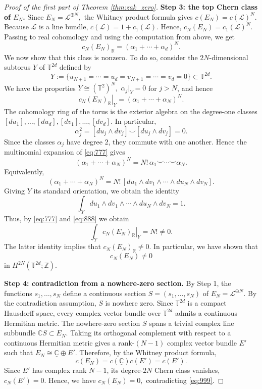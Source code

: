 \documentclass[reqno,a4paper,12pt]{amsart}
\numberwithin{equation}{section}
\def\T{{\mathbb T}}
\newcommand\1{\mathds{1}}
\begin{document}
\begin{proof}[Proof of the first part of Theorem \ref{thm:zak_zero}]
\smallskip
\noindent\textbf{Step 3: the top Chern class of $E_N$.}
Since
$
E_N=\mathcal L^{\oplus N},
$
the Whitney product formula gives
$
c(E_N)=c(\mathcal L)^N.
$
Because $\mathcal L$ is a line bundle,
$
c(\mathcal L)=1+c_1(\mathcal L).
$
Hence,
$
c_N(E_N)=c_1(\mathcal L)^N.
$
Passing to real cohomology and using the computation from above, we get
$$
c_N(E_N)_{\mathbb R}
=
(\alpha_1+\cdots+\alpha_d)^N.
$$
We now show that this class is nonzero. To do so, consider the $2N$-dimensional subtorus $Y$ of $\T^{2d}$ defined by
$$
Y
:=
\{u_{N+1}=\cdots=u_d=v_{N+1}=\cdots=v_d=0\}
\subset \mathbb T^{2d}.
$$
We have the properties
$
Y\cong(\mathbb T^2)^N,
$
$
\alpha_j|_Y=0
$
for $j > N$, and hence
\begin{equation}\label{eq:777}
    \left.c_N(E_N)_{\mathbb R}\right|_Y
=
(\alpha_1+\cdots+\alpha_N)^N.
\end{equation}
The cohomology ring of the torus is the exterior algebra on the degree-one classes
$[du_1],\dots,[du_d],[dv_1],\dots,[dv_d]$. In particular,
$$
\alpha_j^2
=
[du_j\wedge dv_j]\smile[du_j\wedge dv_j]
=
0.
$$
Since the classes $\alpha_j$ have degree $2$, they commute with one another. Hence
the multinomial expansion of \eqref{eq:777} gives
\begin{equation}\label{eq:888}
    (\alpha_1+\cdots+\alpha_N)^N
=
N!\,\alpha_1\smile\cdots\smile\alpha_N.
\end{equation}
Equivalently,
$$
(\alpha_1+\cdots+\alpha_N)^N
=
N!\,[du_1\wedge dv_1\wedge\cdots\wedge du_N\wedge dv_N].
$$
Giving $Y$ its standard orientation, we obtain the identity
$$
\int_Y
du_1\wedge dv_1\wedge\cdots\wedge du_N\wedge dv_N
=
1.
$$
Thus, by \eqref{eq:777} and \eqref{eq:888} we obtain
$$
\int_Y
\left.c_N(E_N)_{\mathbb R}\right|_Y
=
N!\neq 0.
$$
The latter identity implies that
$
c_N(E_N)_{\mathbb R}\neq 0.
$
In particular, we have shown that
\begin{equation}\label{eq:999}
    c_N(E_N)\neq 0
\end{equation}
in $H^{2N}(\mathbb T^{2d};\mathbb Z)$.

\smallskip
\noindent\textbf{Step 4: contradiction from a nowhere-zero section.}
By Step 1, the functions $s_1,\dots,s_N$ define a continuous section
$
S=(s_1,\dots,s_N)
$
of
$
E_N=\mathcal L^{\oplus N}.
$
By the contradiction assumption, $S$ is nowhere zero.
Since $\mathbb T^{2d}$ is a compact Hausdorff space, every complex vector bundle over
$\mathbb T^{2d}$ admits a continuous Hermitian metric. The nowhere-zero section $S$
spans a trivial complex line subbundle
$
\mathbb C S\subset E_N.
$
Taking its orthogonal complement with respect to a continuous Hermitian metric gives
a rank-$(N-1)$ complex vector bundle $E'$ such that
$
E_N\cong \underline{\mathbb C}\oplus E'.
$
Therefore, by the Whitney product formula,
$$
c(E_N)
=
c(\underline{\mathbb C})c(E')
=
c(E').
$$
Since $E'$ has complex rank $N-1$, its degree-$2N$ Chern class vanishes,
$
c_N(E')=0.
$
Hence, we have
$
c_N(E_N)=0,
$
contradicting \eqref{eq:999}.
\end{proof}
\end{document}
